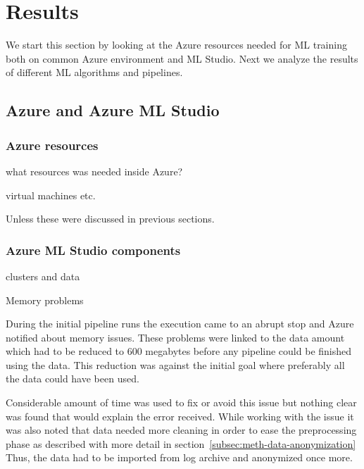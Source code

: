

\section{Results}\label{sec:results}

We start this section by looking at
the Azure resources needed for ML training
both on common Azure environment and ML Studio.
Next we analyze the results of
different ML algorithms and pipelines.

\subsection{Azure and Azure ML Studio}\label{subsec:azure-and-azure-ml-studio}

\subsubsection*{Azure resources}
\begin{itcomment}
    what resources was needed inside Azure?

    virtual machines etc.

    Unless these were discussed in previous sections.
\end{itcomment}


\subsubsection*{Azure ML Studio components}
\begin{itcomment}
    clusters and data

    Memory problems
\end{itcomment}

During the initial pipeline runs
the execution came to an abrupt stop
and Azure notified about memory issues.
These problems were linked to the data amount
which had to be reduced to 600 megabytes
before any pipeline could be finished using the data.
This reduction was against the initial goal
where preferably all the data could have been used.

Considerable amount of time was used
to fix or avoid this issue
but nothing clear was found
that would explain the error received.
While working with the issue
it was also noted
that data needed more cleaning
in order to ease the preprocessing phase
as described with more detail in section~\ref{subsec:meth-data-anonymization}
Thus,
the data had to be imported from log archive
and anonymized once more.


